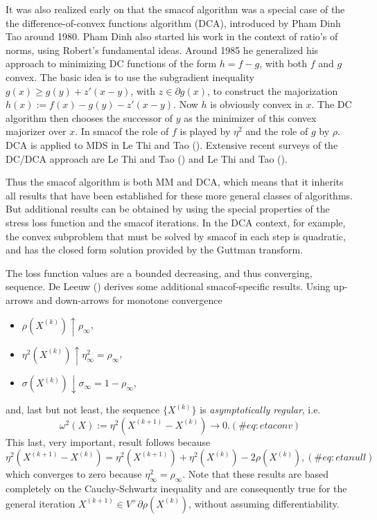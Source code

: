 \documentclass[
  12pt,
  letterpaper,
  DIV=11,
  numbers=noendperiod]{scrartcl}
\providecommand{\tightlist}{%
  \setlength{\itemsep}{0pt}\setlength{\parskip}{0pt}}\usepackage{longtable,booktabs,array}
\begin{document}
It was also realized early on that the smacof algorithm was a special
case of the the difference-of-convex functions algorithm (DCA),
introduced by Pham Dinh Tao around 1980. Pham Dinh also started his work
in the context of ratio's of norms, using Robert's fundamental ideas.
Around 1985 he generalized his approach to minimizing DC functions of
the form \(h=f-g\), with both \(f\) and \(g\) convex. The basic idea is
to use the subgradient inequality \(g(x)\geq g(y)+z'(x-y)\), with
\(z\in\partial g(x)\), to construct the majorization
\(h(x):=f(x)-g(y)-z'(x-y)\). Now \(h\) is obviously convex in \(x\). The
DC algorithm then chooses the successor of \(y\) as the minimizer of
this convex majorizer over \(x\). In smacof the role of \(f\) is played
by \(\eta^2\) and the role of \(g\) by \(\rho\). DCA is applied to MDS
in Le Thi and Tao (). Extensive recent
surveys of the DC/DCA approach are Le Thi and Tao
() and Le Thi and Tao
().

Thus the smacof algorithm is both MM and DCA, which means that it
inherits all results that have been established for these more general
classes of algorithms. But additional results can be obtained by using
the special properties of the stress loss function and the smacof
iterations. In the DCA context, for example, the convex subproblem that
must be solved by smacof in each step is quadratic, and has the closed
form solution provided by the Guttman transform.

The loss function values are a bounded decreasing, and thus converging,
sequence. De Leeuw () derives some
additional smacof-specific results. Using up-arrows and down-arrows for
monotone convergence

\begin{itemize}
\tightlist
\item
  \(\rho(X^{(k)})\uparrow\rho_\infty\),
\item
  \(\eta^2(X^{(k)})\uparrow\eta^2_\infty=\rho_\infty\),
\item
  \(\sigma(X^{(k)})\downarrow\sigma_\infty=1-\rho_\infty\),
\end{itemize}

and, last but not least, the sequence \(\{X^{(k)}\}\) is
\emph{asymptotically regular}, i.e. \begin{equation}
\omega^2(X):=\eta^2(X^{(k+1)}-X^{(k)})\rightarrow 0.
(\#eq:etaconv)
\end{equation} This last, very important, result follows because
\begin{equation}
\eta^2(X^{(k+1)}-X^{(k)})=\eta^2(X^{(k+1)})+\eta^2(X^{(k)})-2\rho(X^{(k)}),
(\#eq:etanull)
\end{equation} which converges to zero because
\(\eta^2_\infty=\rho_\infty\). Note that these results are based
completely on the Cauchy-Schwartz inequality and are consequently true
for the general iteration \(X^{(k+1)}\in V^+\partial\rho(X^{(k)})\),
without assuming differentiability.
\end{document}
